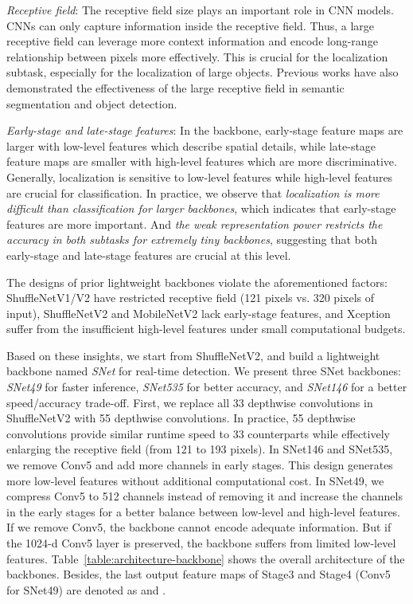\documentclass[10pt,twocolumn,letterpaper]{article}
\begin{document}
\emph{Receptive field}:
The receptive field size plays an important role in CNN models.
CNNs can only capture information inside the receptive field.
Thus, a large receptive field can leverage more context information and encode long-range relationship between pixels more effectively.
This is crucial for the localization subtask, especially for the localization of large objects.
Previous works \cite{peng2017large,li2017light} have also demonstrated the effectiveness of the large receptive field in semantic segmentation and object detection.

\emph{Early-stage and late-stage features}:
In the backbone, early-stage feature maps are larger with low-level features which describe spatial details, while late-stage feature maps are smaller with high-level features which are more discriminative.
Generally, localization is sensitive to low-level features while high-level features are crucial for classification.
In practice, we observe that \emph{localization is more difficult than classification for larger backbones}, which indicates that early-stage features are more important.
And \emph{the weak representation power restricts the accuracy in both subtasks for extremely tiny backbones}, suggesting that both early-stage and late-stage features are crucial at this level.


The designs of prior lightweight backbones violate the aforementioned factors: ShuffleNetV1/V2 \cite{zhang2018shufflenet,ma2018shufflenet} have restricted receptive field (121 pixels vs. 320 pixels of input), ShuffleNetV2 \cite{ma2018shufflenet} and MobileNetV2 \cite{sandler2018mobilenetv2} lack early-stage features, and Xception \cite{chollet2017xception} suffer from the insufficient high-level features under small computational budgets.

Based on these insights, we start from ShuffleNetV2, and build a lightweight backbone named \emph{SNet} for real-time detection.
We present three SNet backbones: \emph{SNet49} for faster inference, \emph{SNet535} for better accuracy, and \emph{SNet146} for a better speed/accuracy trade-off.
First, we replace all 33 depthwise convolutions in ShuffleNetV2 with 55 depthwise convolutions.
In practice, 55 depthwise convolutions provide similar runtime speed to 33 counterparts while effectively enlarging the receptive field (from 121 to 193 pixels).
In SNet146 and SNet535, we remove Conv5 and add more channels in early stages.
This design generates more low-level features without additional computational cost.
In SNet49, we compress Conv5 to 512 channels instead of removing it and increase the channels in the early stages for a better balance between low-level and high-level features.
If we remove Conv5, the backbone cannot encode adequate information.
But if the 1024-d Conv5 layer is preserved, the backbone suffers from limited low-level features.
Table~\ref{table:architecture-backbone} shows the overall architecture of the backbones.
Besides, the last output feature maps of Stage3 and Stage4 (Conv5 for SNet49) are denoted as  and .
\end{document}
